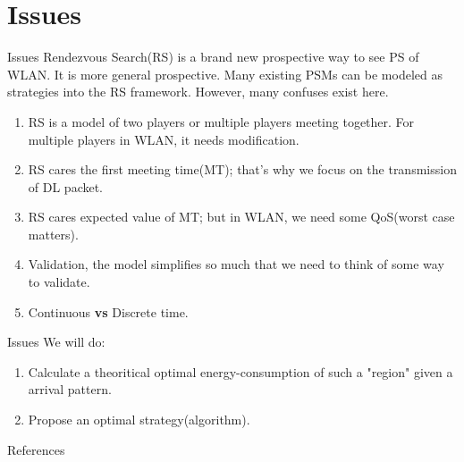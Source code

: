 \documentclass[10pt]{beamer}
\begin{document}
    \section{Issues}
    \begin{frame}{Issues}
        Rendezvous Search(RS) is a brand new prospective way to see PS of WLAN. It is more general prospective. Many existing PSMs can be modeled as strategies into the RS framework. However, many confuses exist here.   
        \begin{enumerate}
            \item RS is a model of two players or multiple players meeting together. For multiple players in WLAN, it needs modification. 
            \item RS cares the first meeting time(MT); that's why we focus on the transmission of  DL packet.   
            \item RS cares expected value of MT; but in WLAN, we need some QoS(worst case matters).   
            \item Validation, the model simplifies so much that we need to think of some way to validate.
            \item Continuous \textbf{vs} Discrete time. 
        \end{enumerate}
    \end{frame}
    \begin{frame}{Issues}
        We will do: 
        \begin{enumerate}
            \item Calculate a theoritical optimal energy-consumption of such a "region" given a arrival pattern.
            \item Propose an optimal strategy(algorithm). 
        \end{enumerate}
    \end{frame}


    \begin{frame}[allowframebreaks]{References}
        
        
    \end{frame}

    
\end{document}

